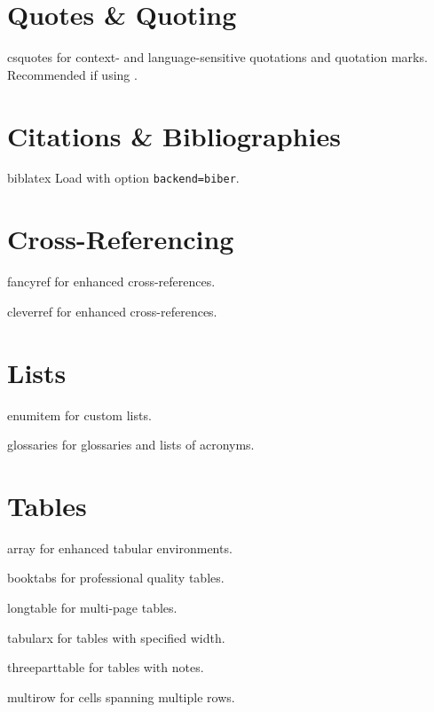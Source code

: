 \documentclass[a4paper,welsh,british,twocolumn]{article}
\begin{document}
\section{Quotes \& Quoting}
\begin{pkgdescription}
  \item[csquotes] for context- and language-sensitive quotations and quotation marks. Recommended if using .
\end{pkgdescription}
\section{Citations \& Bibliographies}
\begin{pkgdescription}
  \item[biblatex] Load with option \verb|backend=biber|.
\end{pkgdescription}
\section{Cross-Referencing}
\begin{pkgdescription}
  \item[fancyref] for enhanced cross-references.
  \item[cleverref] for enhanced cross-references.
\end{pkgdescription}
\section{Lists}
\begin{pkgdescription}
  \item[enumitem] for custom lists.
  \item[glossaries] for glossaries and lists of acronyms.
\end{pkgdescription}
\section{Tables}
\begin{pkgdescription}
  \item[array] for enhanced tabular environments.
  \item[booktabs] for professional quality tables.
  \item[longtable] for multi-page tables.
  \item[tabularx] for tables with specified width.
  \item[threeparttable] for tables with notes.
  \item[multirow] for cells spanning multiple rows.
\end{pkgdescription}
\end{document}
